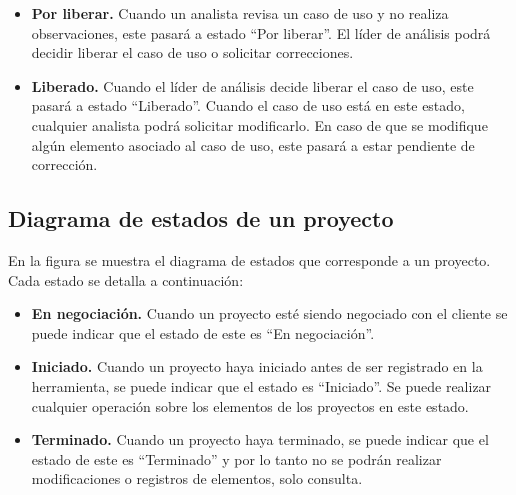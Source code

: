 \begin{itemize}
 \item {\bf Por liberar.} Cuando un analista revisa un caso de uso y no realiza observaciones, este pasará a estado ``Por liberar''. El líder de análisis podrá
 decidir liberar el caso de uso o solicitar correcciones.

 \item {\bf Liberado.} Cuando el líder de análisis decide liberar el caso de uso, este pasará a estado ``Liberado''. Cuando el caso de uso está en este estado, cualquier analista podrá solicitar modificarlo. En caso de que se modifique algún elemento asociado al caso de uso, este pasará a estar pendiente de corrección.

\end{itemize}

\subsection{Diagrama de estados de un proyecto}

En la figura  se muestra el diagrama de estados que corresponde a un proyecto. Cada estado se
detalla a continuación:


\begin{itemize}
 \item {\bf En negociación.} Cuando un proyecto esté siendo negociado con el cliente se puede indicar 
 que el estado de este es ``En negociación''. 
 \item {\bf Iniciado.} Cuando un proyecto haya iniciado antes de ser registrado en la herramienta, se puede indicar que el estado es ``Iniciado''.
 Se puede realizar cualquier operación sobre los elementos de los proyectos en este estado.
 \item {\bf Terminado.} Cuando un proyecto haya terminado, se puede indicar que el estado de este es ``Terminado'' y por lo tanto no se podrán realizar
 modificaciones o registros de elementos, solo consulta.
\end{itemize}